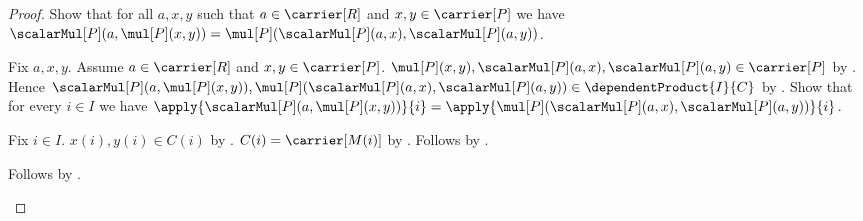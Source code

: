 \begin{proof}
    Show that for all $a,x,y$ such that $a\in\carrier[R]$ and
        $x,y\in\carrier[P]$ we have
        $\scalarMul[P](a,\mul[P](x,y))
            =\mul[P](\scalarMul[P](a,x),\scalarMul[P](a,y))$.
    \begin{subproof}
        Fix $a,x,y$.
        Assume $a\in\carrier[R]$ and $x,y\in\carrier[P]$.
        $\mul[P](x,y),\scalarMul[P](a,x),\scalarMul[P](a,y)
            \in\carrier[P]$ by
            .
        Hence
            $\scalarMul[P](a,\mul[P](x,y)),
                \mul[P](\scalarMul[P](a,x),\scalarMul[P](a,y))
            \in\dependentProduct{I}{C}$ by
            .
        Show that for every $i\in I$ we have
            $\apply{\scalarMul[P](a,\mul[P](x,y))}{i}
                =\apply{\mul[P](
                    \scalarMul[P](a,x),\scalarMul[P](a,y))}{i}$.
        \begin{subproof}
            Fix $i\in I$.
            $x(i),y(i)\in C(i)$ by
                .
            $C(i)=\carrier[M(i)]$ by
                .
            Follows by
                .
        \end{subproof}
        Follows by .
    \end{subproof}


\end{proof}
